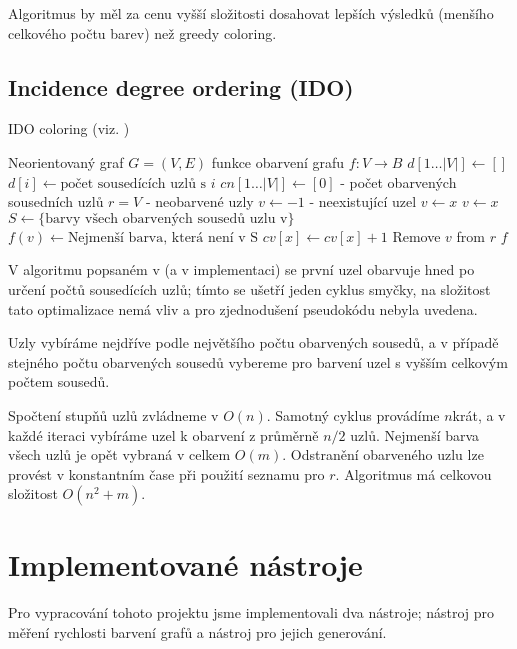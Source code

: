 \documentclass[12pt, a4paper]{article}
\begin{document}
Algoritmus by měl za cenu vyšší složitosti dosahovat lepších výsledků (menšího celkového počtu barev) než greedy coloring.

\subsection{Incidence degree ordering (IDO)}
\begin{algorithm}
\caption{IDO coloring (viz. \cite{lit4})} %
\label{Greedy coloring}
\begin{algorithmic}
\Input Neorientovaný graf $G = (V, E)$
\Output funkce obarvení grafu $f: 	V \rightarrow B$
\State $d[1 \dots |V|] \leftarrow []$
	\State $d[i] \leftarrow \text{počet sousedících uzlů s }i$
\EndFor
\State $cn[1 \dots |V|] \leftarrow [0]$ - počet obarvených sousedních uzlů
\State $r = V$ - neobarvené uzly
	\State $v \leftarrow -1$ - neexistující uzel
			\State $v \leftarrow x$
		\EndIf
			\State $v \leftarrow x$
		\EndIf
	\EndFor
	\State $S \leftarrow \{ \text{barvy všech obarvených sousedů uzlu v} \}$
	\State $f(v) \leftarrow \text{Nejmenší barva, která není v S}$
		\State $cv[x] \leftarrow cv[x] + 1$
	\EndFor
	\State Remove $v$ from $r$
\EndWhile
\State \Return $f$
\end{algorithmic}
\end{algorithm}

V algoritmu popsaném v \cite{ar4} (a v implementaci) se první uzel obarvuje hned po určení počtů sousedících uzlů; tímto se ušetří jeden cyklus smyčky,
na složitost tato optimalizace nemá vliv a pro zjednodušení pseudokódu nebyla uvedena.

Uzly vybíráme nejdříve podle největšího počtu obarvených sousedů, a v případě stejného počtu obarvených sousedů vybereme pro barvení uzel s vyšším celkovým počtem sousedů.

Spočtení stupňů uzlů zvládneme v $O(n)$.
Samotný cyklus provádíme $n$krát, a v každé iteraci vybíráme uzel k obarvení z průměrně $n / 2$ uzlů.
Nejmenší barva všech uzlů je opět vybraná v celkem $O(m)$.
Odstranění obarveného uzlu lze provést v konstantním čase při použití seznamu pro $r$.
Algoritmus má celkovou složitost $O(n^2 + m)$.

\section{Implementované nástroje}
Pro vypracování tohoto projektu jsme implementovali dva nástroje;
nástroj pro měření rychlosti barvení grafů a nástroj pro jejich generování.
\end{document}
